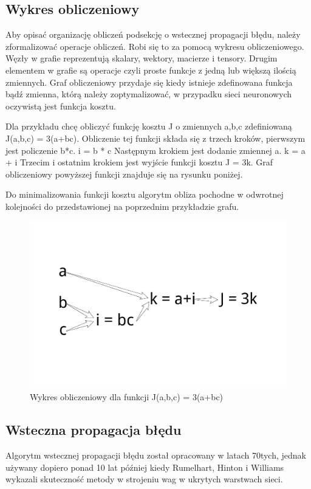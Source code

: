 \documentclass[12pt,a4paper,twoside,titlepage,openright]{book}
\begin{document}
\subsection{Wykres obliczeniowy}
Aby opisać organizację obliczeń podsekcję o wstecznej propagacji błędu, należy zformalizować operacje obliczeń. Robi się to za pomocą wykresu obliczeniowego. Węzły w grafie reprezentują skalary, wektory, macierze i tensory. Drugim elementem w grafie są operacje czyli proste funkcje z jedną lub większą ilością zmiennych. Graf obliczeniowy przydaje się kiedy istnieje zdefinowana funkcja bądź zmienna, którą należy zoptymalizować, w przypadku sieci neuronowych oczywistą jest funkcja kosztu.

Dla przykładu chcę obliczyć funkcję kosztu J o zmiennych a,b,c zdefiniowaną J(a,b,c) = 3(a+bc). Obliczenie tej funkcji składa się z trzech kroków, pierwszym jest policzenie b*c.
i = b * c
Następnym krokiem jest dodanie zmiennej a.
k = a + i
Trzecim i ostatnim krokiem jest wyjście funkcji kosztu J = 3k.
Graf obliczeniowy powyższej funkcji znajduje się na rysunku poniżej.

Do minimalizowania funkcji kosztu algorytm obliza pochodne w odwrotnej kolejności do przedstawionej na poprzednim przykładzie grafu.

\begin{figure}[h]
	\centering
			\includegraphics[resolution=100, scale=0.5]{ComputationGraph.png}
		\caption{Wykres obliczeniowy dla funkcji J(a,b,c) = 3(a+bc)}
\end{figure}

\subsection{Wsteczna propagacja błędu}
Algorytm wstecznej propagacji błędu został opracowany w latach 70tych, jednak używany dopiero ponad 10 lat później kiedy Rumelhart, Hinton i Williams wykazali skuteczność metody w strojeniu wag w ukrytych warstwach sieci.
\end{document}
